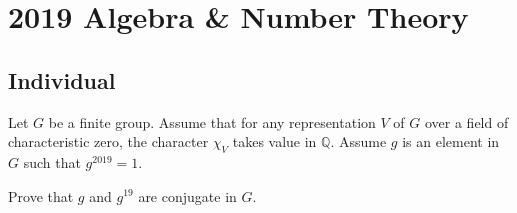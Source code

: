\section{2019 Algebra \& Number Theory}

\subsection*{Individual}
\begin{exercise}
\label{algebra:2019:1}
Let $G$ be a finite group. Assume that for any representation $V$ of $G$ over a field of characteristic zero, the character $\chi_V$ takes value in $\mathbb{Q}$. Assume $g$ is an element in $G$ such that $g^{2019} = 1$.

Prove that $g$ and $g^{19}$ are conjugate in $G$.
\end{exercise}

